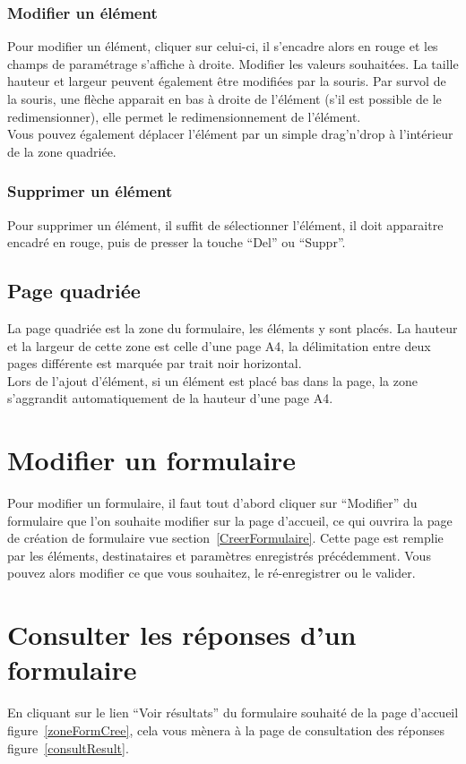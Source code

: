\documentclass[a4paper,11pt,final]{report}
\begin{document}
\subsubsection{Modifier un élément}
Pour modifier un élément, cliquer sur celui-ci, il s'encadre alors en rouge et les champs de paramétrage s'affiche à droite. Modifier les valeurs souhaitées. La taille hauteur et largeur peuvent également être modifiées par la souris. Par survol de la souris, une flèche apparait en bas à droite de l'élément (s'il est possible de le redimensionner), elle permet le redimensionnement de l'élément.\\
Vous pouvez également déplacer l'élément par un simple drag'n'drop à l'intérieur de la zone quadriée.

\subsubsection{Supprimer un élément}
Pour supprimer un élément, il suffit de sélectionner l'élément, il doit apparaitre encadré en rouge, puis de presser la touche ``Del'' ou ``Suppr''.

\subsection{Page quadriée}
La page quadriée est la zone du formulaire, les éléments y sont placés. La hauteur et la largeur de cette zone est celle d'une page A4, la délimitation entre deux pages différente est marquée par trait noir horizontal.\\
Lors de l'ajout d'élément, si un élément est placé bas dans la page, la zone s'aggrandit automatiquement de la hauteur d'une page A4. 

\section{Modifier un formulaire}
Pour modifier un formulaire, il faut tout d'abord cliquer sur ``Modifier'' du formulaire que l'on souhaite modifier sur la page d'accueil, ce qui ouvrira la page de création de formulaire vue section~\ref{CreerFormulaire}. Cette page est remplie par les éléments, destinataires et paramètres enregistrés précédemment. Vous pouvez alors modifier ce que vous souhaitez, le ré-enregistrer ou le valider.


\section{Consulter les réponses d'un formulaire}
En cliquant sur le lien ``Voir résultats'' du formulaire souhaité de la page d'accueil figure~\ref{zoneFormCree}, cela vous mènera à la page de consultation des réponses figure~\ref{consultResult}.
\end{document}
